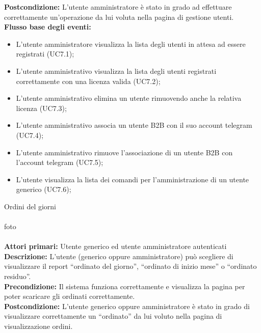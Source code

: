 \textbf{Postcondizione:}  L’utente amministratore è stato in grado ad effettuare correttamente  un’operazione da lui voluta nella pagina di gestione utenti.\\


\textbf{Flusso base degli eventi:} 

\begin{itemize}

\item L’utente amministratore visualizza la lista degli utenti in attesa ad essere registrati (UC7.1);
\item L’utente amministrativo visualizza la lista degli utenti registrati correttamente con una licenza valida (UC7.2);
\item L’utente amministrativo elimina un utente rimuovendo anche la relativa licenza (UC7.3);
\item L’utente amministrativo associa un utente B2B con il suo account telegram (UC7.4);
\item L’utente amministrativo rimuove l’associazione di un utente B2B con l’account telegram (UC7.5);
\item L’utente visualizza la lista dei comandi per l’amministrazione di un utente generico (UC7.6);


\end{itemize}  



Ordini del giorni \\\\

foto\\\\

\textbf{Attori primari:} Utente generico ed utente amministratore autenticati
\\


\textbf{Descrizione:} L’utente (generico oppure amministratore) può scegliere di visualizzare il report “ordinato del giorno”, “ordinato di inizio mese” o “ordinato residuo”. \\

\textbf{Precondizione:} Il sistema funziona correttamente e visualizza la pagina per poter scaricare gli ordinati correttamente. \\

\textbf{Postcondizione:}  L’utente generico oppure amministratore è stato in grado di visualizzare correttamente  un “ordinato” da lui voluto nella pagina di visualizzazione ordini. \\


